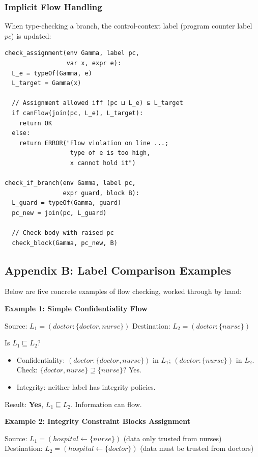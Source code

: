 \subsubsection*{Implicit Flow Handling}

When type-checking a branch, the control-context label (program counter label $pc$) is updated:

\begin{verbatim}
check_assignment(env Gamma, label pc, 
                 var x, expr e):
  L_e = typeOf(Gamma, e)
  L_target = Gamma(x)
  
  // Assignment allowed iff (pc ⊔ L_e) ⊆ L_target
  if canFlow(join(pc, L_e), L_target):
    return OK
  else:
    return ERROR("Flow violation on line ...; 
                  type of e is too high, 
                  x cannot hold it")

check_if_branch(env Gamma, label pc,
                expr guard, block B):
  L_guard = typeOf(Gamma, guard)
  pc_new = join(pc, L_guard)
  
  // Check body with raised pc
  check_block(Gamma, pc_new, B)
\end{verbatim}

\subsection{Appendix B: Label Comparison Examples}

Below are five concrete examples of flow checking, worked through by hand:

\textbf{Example 1: Simple Confidentiality Flow}

Source: $L_1 = (doctor:\{doctor,nurse\})$
Destination: $L_2 = (doctor:\{nurse\})$

Is $L_1 \sqsubseteq L_2$?

\begin{itemize}
    \item Confidentiality: $(doctor:\{doctor,nurse\})$ in $L_1$; $(doctor:\{nurse\})$ in $L_2$. Check: $\{doctor, nurse\} \supseteq \{nurse\}$? Yes.
    \item Integrity: neither label has integrity policies.
\end{itemize}

Result: \textbf{Yes}, $L_1 \sqsubseteq L_2$. Information can flow.

\textbf{Example 2: Integrity Constraint Blocks Assignment}

Source: $L_1 = (hospital \leftarrow \{nurse\})$ (data only trusted from nurses)
Destination: $L_2 = (hospital \leftarrow \{doctor\})$ (data must be trusted from doctors)

